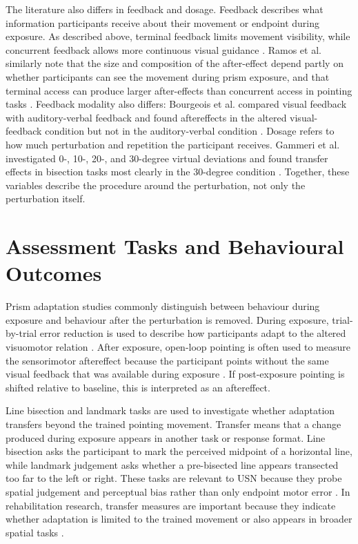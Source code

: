The literature also differs in feedback and dosage. Feedback describes what information participants receive about their movement or endpoint during exposure. As described above, terminal feedback limits movement visibility, while concurrent feedback allows more continuous visual guidance \cite{Serino2011}. Ramos et al. similarly note that the size and composition of the after-effect depend partly on whether participants can see the movement during prism exposure, and that terminal access can produce larger after-effects than concurrent access in pointing tasks \cite{Ramos2019}. Feedback modality also differs: Bourgeois et al. compared visual feedback with auditory-verbal feedback and found aftereffects in the altered visual-feedback condition but not in the auditory-verbal condition \cite{Bourgeois2021}. Dosage refers to how much perturbation and repetition the participant receives. Gammeri et al. investigated 0-, 10-, 20-, and 30-degree virtual deviations and found transfer effects in bisection tasks most clearly in the 30-degree condition \cite{Gammeri2020}. Together, these variables describe the procedure around the perturbation, not only the perturbation itself.

\section{Assessment Tasks and Behavioural Outcomes}
\label{sec:background-assessment-tasks}

Prism adaptation studies commonly distinguish between behaviour during exposure and behaviour after the perturbation is removed. During exposure, trial-by-trial error reduction is used to describe how participants adapt to the altered visuomotor relation \cite{serino2006mechanisms,Serino2011}. After exposure, open-loop pointing is often used to measure the sensorimotor aftereffect because the participant points without the same visual feedback that was available during exposure \cite{Rossetti1998Prism,Ramos2019,anan2025comparative}. If post-exposure pointing is shifted relative to baseline, this is interpreted as an aftereffect.

Line bisection and landmark tasks are used to investigate whether adaptation transfers beyond the trained pointing movement. Transfer means that a change produced during exposure appears in another task or response format. Line bisection asks the participant to mark the perceived midpoint of a horizontal line, while landmark judgement asks whether a pre-bisected line appears transected too far to the left or right. These tasks are relevant to USN because they probe spatial judgement and perceptual bias rather than only endpoint motor error \cite{frassinetti2002long,Serino2011,Bourgeois2021,anan2025comparative}. In rehabilitation research, transfer measures are important because they indicate whether adaptation is limited to the trained movement or also appears in broader spatial tasks \cite{frassinetti2002long,serino2006mechanisms,Serino2011}.

